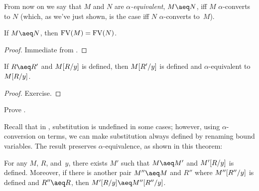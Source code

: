\documentclass[../../../include/open-logic-section]{subfiles}
\begin{document}
From now on we say that $M$ and $N$ are \emph{$\alpha$-equivalent}, $M
\aeq N$, iff $M$ $\alpha$-converts to $N$ (which, as we've just shown,
is the case iff $N$ $\alpha$-converts to~$M$).

\begin{thm}
  If $M \aeq N$, then $\mathrm{FV}({M}) = \mathrm{FV}({N})$.
\end{thm}

\begin{proof}
  Immediate from .
\end{proof}

\begin{lem}
  If $R \aeq R'$ and $M[R/y]$ is defined, then $M[R'/y]$ is
  defined and $\alpha$-equivalent to $M[R/y]$.
\end{lem}

\begin{proof}
  Exercise.
\end{proof}

\begin{prob}
  Prove .
\end{prob}

Recall that in , substitution is undefined in some
cases; however, using $\alpha$-conversion on terms, we can make
substitution always defined by renaming bound variables. The result
preserves $\alpha$-equivalence, as shown in this theorem:

\begin{thm}
  For any $M$, $R$, and~$y$, there exists $M'$ such that $M \aeq M'$
  and $M'[R/y]$ is defined. Moreover, if there is another
  pair $M'' \aeq M$ and $R''$ where $M''[R''/y]$ is defined
  and $R'' \aeq R$, then $\Subst{M'}{R}{y} \aeq \Subst{M''}{R''}{y}$.
\end{thm}
\end{document}
